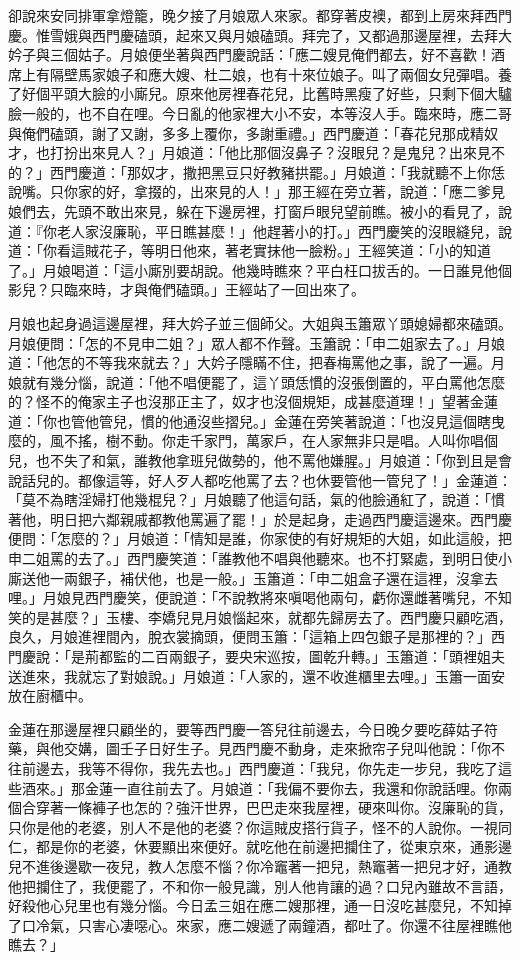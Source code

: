 卻說來安同排軍拿燈籠，晚夕接了月娘眾人來家。都穿著皮襖，都到上房來拜西門慶。惟雪娥與西門慶磕頭，起來又與月娘磕頭。拜完了，又都過那邊屋裡，去拜大妗子與三個姑子。月娘便坐著與西門慶說話：「應二嫂見俺們都去，好不喜歡！酒席上有隔壁馬家娘子和應大嫂、杜二娘，也有十來位娘子。叫了兩個女兒彈唱。養了好個平頭大臉的小廝兒。原來他房裡春花兒，比舊時黑瘦了好些，只剩下個大驢臉一般的，也不自在哩。今日亂的他家裡大小不安，本等沒人手。臨來時，應二哥與俺們磕頭，謝了又謝，多多上覆你，多謝重禮。」西門慶道：「春花兒那成精奴才，也打扮出來見人？」月娘道：「他比那個沒鼻子？沒眼兒？是鬼兒？出來見不的？」西門慶道：「那奴才，撒把黑豆只好教豬拱罷。」月娘道：「我就聽不上你恁說嘴。只你家的好，拿掇的，出來見的人！」那王經在旁立著，說道：「應二爹見娘們去，先頭不敢出來見，躲在下邊房裡，打窗戶眼兒望前瞧。被小的看見了，說道：『你老人家沒廉恥，平日瞧甚麼！」他趕著小的打。」西門慶笑的沒眼縫兒，說道：「你看這賊花子，等明日他來，著老實抹他一臉粉。」王經笑道：「小的知道了。」月娘喝道：「這小廝別要胡說。他幾時瞧來？平白枉口拔舌的。一日誰見他個影兒？只臨來時，才與俺們磕頭。」王經站了一回出來了。

月娘也起身過這邊屋裡，拜大妗子並三個師父。大姐與玉簫眾丫頭媳婦都來磕頭。月娘便問：「怎的不見申二姐？」眾人都不作聲。玉簫說：「申二姐家去了。」月娘道：「他怎的不等我來就去？」大妗子隱瞞不住，把春梅罵他之事，說了一遍。月娘就有幾分惱，說道：「他不唱便罷了，這丫頭恁慣的沒張倒置的，平白罵他怎麼的？怪不的俺家主子也沒那正主了，奴才也沒個規矩，成甚麼道理！」望著金蓮道：「你也管他管兒，慣的他通沒些摺兒。」金蓮在旁笑著說道：「也沒見這個瞎曳麼的，風不搖，樹不動。你走千家門，萬家戶，在人家無非只是唱。人叫你唱個兒，也不失了和氣，誰教他拿班兒做勢的，他不罵他嫌腥。」月娘道：「你到且是會說話兒的。都像這等，好人歹人都吃他罵了去？也休要管他一管兒了！」金蓮道：「莫不為瞎淫婦打他幾棍兒？」月娘聽了他這句話，氣的他臉通紅了，說道：「慣著他，明日把六鄰親戚都教他罵遍了罷！」於是起身，走過西門慶這邊來。西門慶便問：「怎麼的？」月娘道：「情知是誰，你家使的有好規矩的大姐，如此這般，把申二姐罵的去了。」西門慶笑道：「誰教他不唱與他聽來。也不打緊處，到明日使小廝送他一兩銀子，補伏他，也是一般。」玉簫道：「申二姐盒子還在這裡，沒拿去哩。」月娘見西門慶笑，便說道：「不說教將來嗔喝他兩句，虧你還雌著嘴兒，不知笑的是甚麼？」玉樓、李嬌兒見月娘惱起來，就都先歸房去了。西門慶只顧吃酒，良久，月娘進裡間內，脫衣裳摘頭，便問玉簫：「這箱上四包銀子是那裡的？」西門慶說：「是荊都監的二百兩銀子，要央宋巡按，圖乾升轉。」玉簫道：「頭裡姐夫送進來，我就忘了對娘說。」月娘道：「人家的，還不收進櫃里去哩。」玉簫一面安放在廚櫃中。

金蓮在那邊屋裡只顧坐的，要等西門慶一答兒往前邊去，今日晚夕要吃薛姑子符藥，與他交媾，圖壬子日好生子。見西門慶不動身，走來掀帘子兒叫他說：「你不往前邊去，我等不得你，我先去也。」西門慶道：「我兒，你先走一步兒，我吃了這些酒來。」那金蓮一直往前去了。月娘道：「我偏不要你去，我還和你說話哩。你兩個合穿著一條褲子也怎的？強汗世界，巴巴走來我屋裡，硬來叫你。沒廉恥的貨，只你是他的老婆，別人不是他的老婆？你這賊皮搭行貨子，怪不的人說你。一視同仁，都是你的老婆，休要顯出來便好。就吃他在前邊把攔住了，從東京來，通影邊兒不進後邊歇一夜兒，教人怎麼不惱？你冷竈著一把兒，熱竈著一把兒才好，通教他把攔住了，我便罷了，不和你一般見識，別人他肯讓的過？口兒內雖故不言語，好殺他心兒里也有幾分惱。今日孟三姐在應二嫂那裡，通一日沒吃甚麼兒，不知掉了口冷氣，只害心凄噁心。來家，應二嫂遞了兩鐘酒，都吐了。你還不往屋裡瞧他瞧去？」


